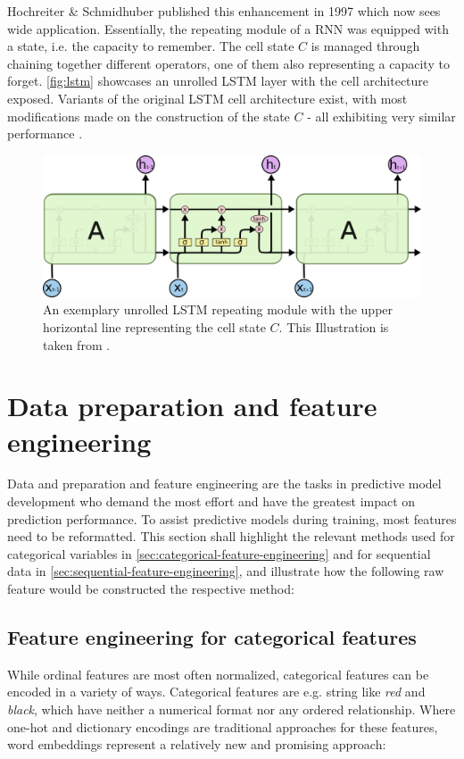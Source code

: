 Hochreiter \& Schmidhuber published this enhancement in 1997 \cite{hochreiter1997} which now sees wide application. Essentially, the repeating module of a RNN was equipped with a state, i.e. the capacity to remember. The cell state $C$ is managed through chaining together different operators, one of them also representing a capacity to forget. \autoref{fig:lstm} showcases an unrolled LSTM layer with the cell architecture exposed. Variants of the original LSTM cell architecture exist, with most modifications made on the construction of the state $C$ - all exhibiting very similar performance \cite{greff2017lstm}.

\begin{figure}[ht!]
    \centering
    \includegraphics[width=.8\textwidth]{gfx/lstm-chain.png}
    \caption{An exemplary unrolled LSTM repeating module with the upper horizontal line representing the cell state $C$. This Illustration is taken from \cite{web:colah}.}
    \label{fig:lstm}
\end{figure}

\section{Data preparation and feature engineering}
Data and preparation and feature engineering are the tasks in predictive model development who demand the most effort and have the greatest impact on prediction performance. To assist predictive models during training, most features need to be reformatted. This section shall highlight the relevant methods used for categorical variables in \autoref{sec:categorical-feature-engineering} and for sequential data in \autoref{sec:sequential-feature-engineering}, and illustrate how the following raw feature would be constructed the respective method:

\subsection{Feature engineering for categorical features}
\label{sec:categorical-feature-engineering}
While ordinal features are most often normalized, categorical features can be encoded in a variety of ways. Categorical features are e.g. string like \textit{red} and \textit{black}, which have neither a numerical format nor any ordered relationship. Where one-hot and dictionary encodings are traditional approaches for these features, word embeddings represent a relatively new and promising approach:

